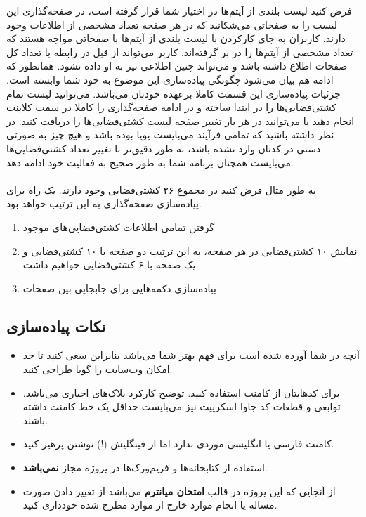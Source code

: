 \documentclass[../main.tex]{subfiles}
\begin{document}
فرض کنید لیست بلندی از آیتم‌ها در اختیار شما قرار گرفته است، در صفحه‌گذاری این لیست را به صفحاتی می‌شکانید که در هر صفحه تعداد مشخصی از اطلاعات وجود دارند. کاربران به جای کارکردن با لیست بلندی از آیتم‌ها با صفحاتی مواجه هستند که تعداد مشخصی از آیتم‌ها را در بر گرفته‌اند. کاربر می‌تواند از قبل در رابطه با تعداد کل صفحات اطلاع داشته باشد و می‌تواند چنین اطلاعی نیز به او داده نشود. همانطور که ادامه هم بیان می‌شود چگونگی پیاده‌سازی این موضوع به خود شما وابسته است.
جزئیات پیاده‌سازی این قسمت کاملا برعهده خودتان می‌باشد.
می‌توانید لیست تمام کشتی‌فضایی‌ها را در ابتدا ساخته و در ادامه صفحه‌گذاری را کاملا در سمت کلاینت انجام دهید یا می‌توانید در هر بار تغییر صفحه لیست کشتی‌فضایی‌ها را دریافت کنید.
در نظر داشته باشید که تمامی فرآیند می‌بایست پویا بوده باشد و هیچ چیز به صورتی دستی در کدتان وارد نشده باشد، به طور دقیق‌تر با تغییر تعداد کشتی‌فضایی‌ها می‌بایست همچنان برنامه شما به طور صحیح به فعالیت خود ادامه دهد.

\paragraph{}
به طور مثال فرض کنید در مجموع ۲۶ کشتی‌فضایی وجود دارند. یک راه برای پیاده‌سازی صفحه‌گذاری به این ترتیب خواهد بود.

\begin{enumerate}
  \item گرفتن تمامی اطلاعات کشتی‌فضایی‌های موجود
  \item نمایش ۱۰ کشتی‌فضایی در هر صفحه، به این ترتیب دو صفحه با ۱۰ کشتی‌فضایی و یک صفحه با ۶ کشتی‌فضایی خواهیم داشت.
  \item پیاده‌سازی دکمه‌هایی برای جابجایی بین صفحات
\end{enumerate}

\subsection{نکات پیاده‌سازی}

\begin{itemize}
    \item آنچه در شما آورده شده است برای فهم بهتر شما می‌باشد بنابراین سعی کنید تا حد امکان وب‌سایت را گویا طراحی کنید.
    \item برای کدهایتان از کامنت استفاده کنید. توضیح کارکرد بلاک‌های  اجباری می‌باشد. توابعی و قطعات کد جاوا اسکریپت نیز می‌بایست حداقل یک خط کامنت داشته باشند.
    \item کامنت فارسی یا انگلیسی موردی ندارد اما از فینگلیش (!) نوشتن پرهیز کنید.
    \item استفاده از کتابخانه‌ها و فریم‌ورک‌ها در پروژه مجاز \textbf{نمی‌باشد}.
    \item از آنجایی که این پروژه در قالب \textbf{امتحان میانترم} می‌باشد از تغییر دادن صورت مساله یا انجام موارد خارج از موارد مطرح شده خودداری کنید.
\end{itemize}
\end{document}
